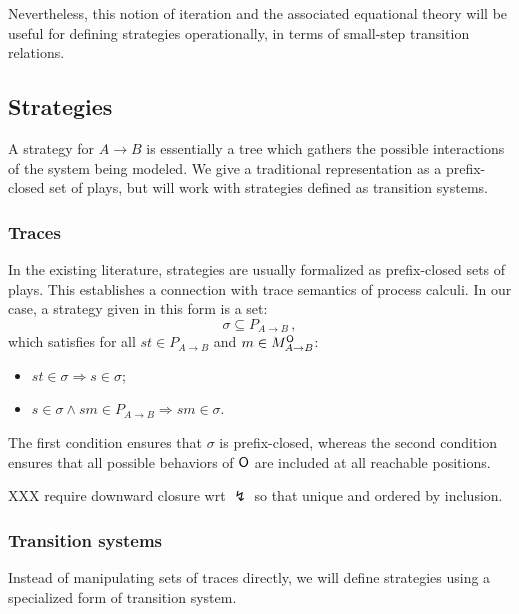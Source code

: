 Nevertheless,
this notion of iteration
and the associated equational theory
will be useful
for defining strategies operationally,
in terms of small-step transition relations.


\subsection{Strategies} %

A strategy for $A \rightarrow B$
is essentially a tree
which gathers the possible interactions of
the system being modeled.
We give a traditional representation
as a prefix-closed set of plays,
but will work with strategies defined as transition systems.

\subsubsection{Traces} %

In the existing literature,
strategies are usually formalized as prefix-closed sets of plays.
This establishes a connection with trace semantics of process calculi.
In our case,
a strategy given in this form is a set:
\[ \sigma \subseteq P_{A \rightarrow B} \,, \]
which satisfies
for all $st \in P_{A \rightarrow B}$
and $m \in M_{A \rightarrow B}^{ \mathsf{O} }$:
\begin{itemize}
  \item $st \in \sigma \Rightarrow s \in \sigma$;
  \item $s \in \sigma \wedge sm \in P_{A \rightarrow B}
    \Rightarrow sm \in \sigma$.
\end{itemize}
The first condition ensures that $\sigma$ is prefix-closed,
whereas the second condition ensures that
all possible behaviors of $ \mathsf{O} $ are included
at all reachable positions.

XXX require downward closure wrt $\lightning$
so that unique and ordered by inclusion.


\subsubsection{Transition systems} %

Instead of manipulating sets of traces directly,
we will define strategies using a specialized form of transition system.

